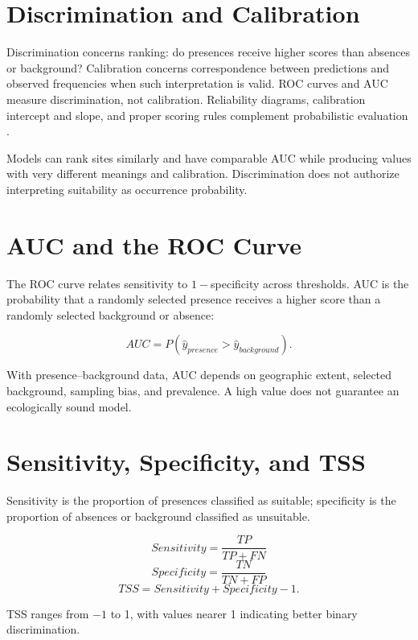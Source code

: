 \section{Discrimination and Calibration}
Discrimination concerns ranking: do presences receive higher scores than
absences or background? Calibration concerns correspondence between predictions
and observed frequencies when such interpretation is valid. ROC curves and AUC
measure discrimination, not calibration. Reliability diagrams, calibration
intercept and slope, and proper scoring rules complement probabilistic evaluation
\parencite{vaughan2005testing,jimenezvalverde2013discrimination}.

\begin{conceito}[title={\faBalanceScale\quad A model can rank correctly but miss the magnitude}]
Models can rank sites similarly and have comparable AUC while producing values
with very different meanings and calibration. Discrimination does not authorize
interpreting suitability as occurrence probability.
\end{conceito}

\section{AUC and the ROC Curve}
The ROC curve relates sensitivity to $1-$specificity across thresholds. AUC is
the probability that a randomly selected presence receives a higher score than
a randomly selected background or absence:
\begin{equationbox}
\[AUC=P(\hat y_{presence}>\hat y_{background}).\]
\end{equationbox}
\begin{atencao}[title={\faExclamationTriangle\quad Limitations of AUC}]
With presence--background data, AUC depends on geographic extent, selected
background, sampling bias, and prevalence. A high value does not guarantee an
ecologically sound model.
\end{atencao}

\section{Sensitivity, Specificity, and TSS}
Sensitivity is the proportion of presences classified as suitable; specificity
is the proportion of absences or background classified as unsuitable.
\begin{equationbox}
\[Sensitivity=\frac{TP}{TP+FN}\]
\[Specificity=\frac{TN}{TN+FP}\]
\[TSS=Sensitivity+Specificity-1.\]
\end{equationbox}
TSS ranges from $-1$ to 1, with values nearer 1 indicating better binary discrimination.

